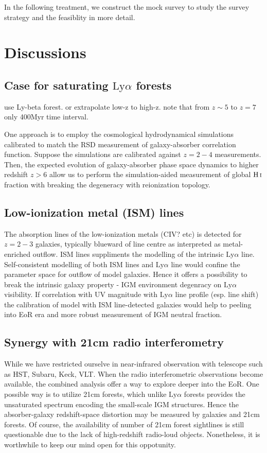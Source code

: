 \documentclass[useAMS,usenatbib,twocolumn]{mn2e}
\newcommand{\HI}{{\rm H\,{\scriptstyle I}}}
\newcommand{\LyA}{\mbox{Ly}\alpha}
\begin{document}
In the following treatment, we construct the mock survey to study the 
survey strategy and the feasiblity in more detail.



\section{Discussions}

\subsection{Case for saturating $\LyA$ forests}
use Ly-beta forest. or extrapolate low-z to high-z. note that
from $z\sim5$ to $z=7$ only 400Myr time interval.

One approach is to employ the cosmological hydrodynamical simulations
calibrated to match the RSD measurement of galaxy-absorber correlation function.
Suppose the simulations are calibrated against $z=2-4$ measurements. Then,
the expected evolution of galaxy-absorber phase space dynamics to higher 
redshift $z>6$ allow us to perform the simulation-aided measurement of
global $\HI$ fraction with breaking the degeneracy with reionization topology.


\subsection{Low-ionization metal (ISM) lines}
The absorption lines of the low-ionization metals (CIV? etc) is detected
for $z=2-3$ galaxies, typically blueward of line centre as interpreted
as metal-enriched outflow. 
ISM lines suppliments the modelling of the intrinsic $\LyA$ line. 
Self-consistent modelling of both ISM lines and $\LyA$ line would confine
the parameter space for outflow of model galaxies. Hence it offers a 
possibility to break the intrinsic galaxy property - IGM environment 
degenracy on $\LyA$ visibility. If correlation with UV magnitude with
$\LyA$ line profile (esp. line shift) the calibration of model with
ISM line-detected galaxies would help to peeling into EoR era and
more robust measurement of IGM neutral fraction.
 


\subsection{Synergy with 21cm radio interferometry}
While we have restricted ourselve in near-infrared observation with telescope
such as HST, Subaru, Keck, VLT. When the radio interferometric observations
become available, the combined analysis offer a way to explore deeper into
the EoR. One possible way is to utilize 21cm forests, which unlike 
$\LyA$ forests provides the unsaturated spectrum encoding the small-scale
IGM structures. Hence the absorber-galaxy redshift-space distortion may be
measured by galaxies and 21cm forests. Of course, the availability of number
of 21cm forest sightlines is still questionable due to the lack of high-redshift
radio-loud objects. Nonetheless, it is worthwhile to keep our mind open 
for this oppotunity.  
\end{document}
